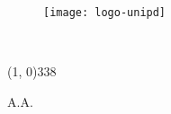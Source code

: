 \frontmatter
\begin{titlepage}

\begin{center}

\begin{LARGE}
\textbf{\myUni}\\
\end{LARGE}

\vspace{10pt}

\begin{Large}
\textsc{\myDepartment}\\
\end{Large}

\vspace{10pt}

\begin{large}
\textsc{\myFaculty}\\
\end{large}

\vspace{30pt}
\begin{figure}[htbp]
\begin{center}
\texttt{[image: logo-unipd]}
\end{center}
\end{figure}

\vfill

\begin{LARGE}
\begin{center}
\textbf{\myTitle}\\
\end{center}
\end{LARGE}

\vspace{1pt}

\begin{normalsize}
\textsc{\myVersion}
\end{normalsize}


\vfill

\line(1, 0){338} \\
\begin{normalsize}
\textsc{A.A. \myAA}
\end{normalsize}

\end{center}
\end{titlepage}
